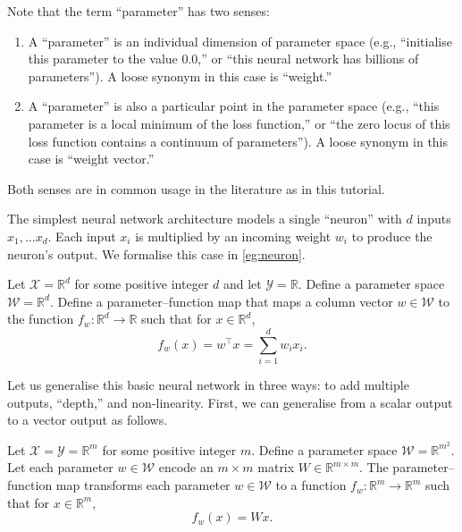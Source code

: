 \documentclass[11pt]{article}
\newcommand{\R}{\mathbb{R}}
\newcommand{\X}{\mathcal{X}}
\newcommand{\Y}{\mathcal{Y}}
\newcommand{\W}{\mathcal{W}}
\begin{document}
\begin{remark}[Parameters]
    Note that the term ``parameter'' has two senses:
    \begin{enumerate}
        \item
            A ``parameter'' is an individual dimension of parameter space
            (e.g., ``initialise this parameter to the value $0.0$,'' or ``this
            neural network has billions of parameters''). A loose synonym in
            this case is ``weight.''
        \item
            A ``parameter'' is also a particular point in the parameter space
            (e.g., ``this parameter is a local minimum of the loss function,''
            or ``the zero locus of this loss function contains a continuum of
            parameters''). A loose synonym in this case is ``weight vector.''
    \end{enumerate}
    Both senses are in common usage in the literature as in this tutorial.
\end{remark}

The simplest neural network architecture models a single ``neuron'' with $d$
inputs $x_1, \ldots x_d$. Each input $x_i$ is multiplied by an incoming weight
$w_i$ to produce the neuron's output. We formalise this case in
\cref{eg:neuron}.

\begin{example}\label{eg:neuron}
    Let $\X = \R^d$ for some positive integer $d$ and let $\Y = \R$. Define a
    parameter space $\W = \R^d$. Define a parameter--function map that maps a
    column vector $w \in \W$ to the function $f_w : \R^d \to \R$ such that for
    $x \in \R^d$,
    \begin{equation}
        f_w(x)
        = w^\top x
        = \sum_{i=1}^d w_i x_i.
    \end{equation}
\end{example}

Let us generalise this basic neural network in three ways: to add multiple
outputs, ``depth,'' and non-linearity. First, we can generalise from a scalar
output to a vector output as follows.

\begin{example}\label{eg:linear}
    Let $\X = \Y = \R^m$ for some positive integer $m$.
    Define a parameter space $\W = \R^{m^2}$. Let each parameter $w \in \W$
    encode an $m \times m$ matrix $W \in \R^{m \times m}$. The
    parameter--function map transforms each parameter $w \in \W$ to a function
    $f_w : \R^m \to \R^m$ such that for $x \in \R^m$,
    \begin{equation}
        f_w(x) = W x.
    \end{equation}
\end{example}
\end{document}
